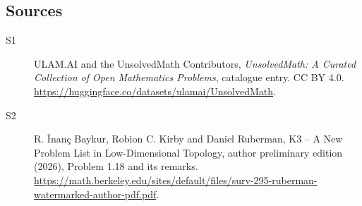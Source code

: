 \documentclass[11pt]{article}
\begin{document}
\subsection{Sources}
\begin{description}
\item[\hypertarget{source:statement:1}{S1}] ULAM.AI and the UnsolvedMath Contributors, \emph{UnsolvedMath: A Curated Collection of Open Mathematics Problems}, catalogue entry. CC BY 4.0. \url{https://huggingface.co/datasets/ulamai/UnsolvedMath}.
\item[\hypertarget{source:statement:2}{S2}] R. \.{I}nan\c{c} Baykur, Robion C. Kirby and Daniel Ruberman, K3 -- A New Problem List in Low-Dimensional Topology, author preliminary edition (2026), Problem 1.18 and its remarks. \url{https://math.berkeley.edu/sites/default/files/surv-295-ruberman-watermarked-author-pdf.pdf}.
\end{description}
\label{end:statement}
\end{document}
